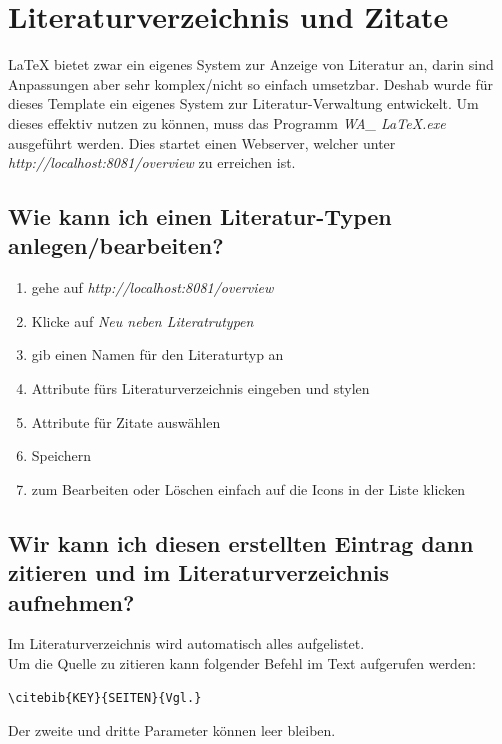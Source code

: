 \documentclass[12pt]{article}
\begin{document}
\section{Literaturverzeichnis und Zitate}
LaTeX bietet zwar ein eigenes System zur Anzeige von Literatur an, darin sind Anpassungen aber sehr komplex/nicht so einfach umsetzbar. Deshab wurde für dieses Template ein eigenes System zur Literatur-Verwaltung entwickelt. Um dieses effektiv nutzen zu können, muss das Programm \textit{WA\_ LaTeX.exe} ausgeführt werden. Dies startet einen Webserver, welcher unter \textit{http://localhost:8081/overview} zu erreichen ist.

\subsection{Wie kann ich einen Literatur-Typen anlegen/bearbeiten?}
\begin{enumerate}
\item gehe auf \textit{http://localhost:8081/overview}
\item Klicke auf \textit{Neu neben Literatrutypen}
\item gib einen Namen für den Literaturtyp an
\item Attribute fürs Literaturverzeichnis eingeben und stylen
\item Attribute für Zitate auswählen
\item Speichern
\item zum Bearbeiten oder Löschen einfach auf die Icons in der Liste klicken
\end{enumerate}

\subsection{Wir kann ich diesen erstellten Eintrag dann zitieren und im Literaturverzeichnis aufnehmen?}
Im Literaturverzeichnis wird automatisch alles aufgelistet.\\[6pt]Um die Quelle zu zitieren kann folgender Befehl im Text aufgerufen werden:
\begin{verbatim}
\citebib{KEY}{SEITEN}{Vgl.}
\end{verbatim}
Der zweite und dritte Parameter können leer bleiben.
\end{document}
